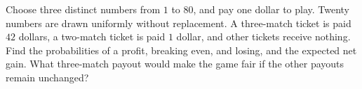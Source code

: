 Choose three distinct numbers from $1$ to $80$, and pay one dollar to play. Twenty numbers are drawn uniformly without replacement. A three-match ticket is paid $42$ dollars, a two-match ticket is paid $1$ dollar, and other tickets receive nothing. Find the probabilities of a profit, breaking even, and losing, and the expected net gain. What three-match payout would make the game fair if the other payouts remain unchanged?
